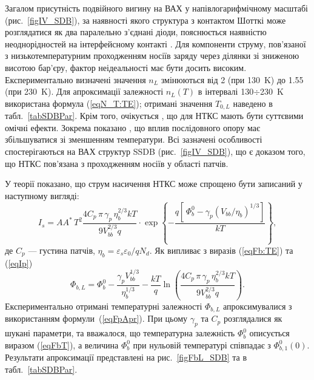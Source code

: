 Загалом присутність подвійного вигину на ВАХ у напівлогарифмічному масштабі (рис.~\ref{figIV_SDB}),
за наявності якого структура з контактом Шотткі може розглядатися як два паралельно з'єднані діоди, пояснюється наявністю неоднорідностей на інтерфейсному контакті \cite{Tung:PhysRev,Tung:MSE}.
Для компоненти струму, пов'язаної з низькотемпературним проходженням носіїв заряду
через ділянки зі зниженою висотою бар'єру,
фактор неідеальності має бути досить високим.
Експериментально визначені значення $n_L$ змінюються від 2 (при 130~K) до 1.55 (при 230~K).
Для апроксимації залежності $n_L(T)$ в  інтервалі 130$\div$230~K  використана формула (\ref{eqN_T:TE});
отримані значення $T_{0,L}$ наведено в табл.~\ref{tabSDBPar}.
Крім того, очікується \cite{Tung:PhysRev,Tung:MSE}, що для НТКС мають бути суттєвими омічні ефекти.
Зокрема показано \cite{Gammon2013}, що вплив послідовного опору має збільшуватися зі зменшенням температури.
Всі зазначені особливості спостерігаються на ВАХ структур SSDB (рис.~\ref{figIV_SDB}),
що є доказом того, що НТКС пов'язана з проходженням носіїв у області патчів.


У теорії \cite{Tung:PhysRev} показано, що струм насичення НТКС може спрощено бути записаний у наступному вигляді:
\begin{equation}
\label{eqIp}
I_s=AA^*\,T^2\frac{4C_p\,\pi\,\gamma_p\,\eta_b^{2/3}kT}{9V_{bb}^{2/3}q}\cdot
\exp\left\{-\frac{q\left[\,\Phi_{b}^0-\gamma_p (V_{bb}/\eta_b)^{1/3}\right]}{kT}\right\},
\end{equation}
де
$C_p$ --- густина патчів,
$\eta_{b}=\varepsilon_s\varepsilon_0/qN_d$.
Як випливає з виразів (\ref{eqFb:TE}) та (\ref{eqIp})
\begin{equation}
\label{eqFpApr}
\Phi_{b,L}=\Phi_{b}^0-\frac{\gamma_p V_{bb}^{1/3}}{\eta_b^{1/3}} -\frac{kT}{q}\ln\left(\frac{4C_p\,\pi\,\gamma_p\,\eta_b^{2/3}kT}{9V_{bb}^{2/3}q}\right).
\end{equation}
Експериментально отримані температурні залежності $\Phi_{b,L}$ апроксимувалися з використанням формули~(\ref{eqFpApr}).
При цьому $\gamma_p$ та $C_p$ розглядалися як шукані параметри,
та вважалося, що температурна залежність $\Phi_{b}^0$ описується виразом (\ref{eqFbT}), а величина $\Phi_{b}^0$ при нульовій температурі
співпадає з $\Phi_{b,1}^0(0)$.
Результати апроксимації представлені на рис.~\ref{figFbL_SDB} та в табл.~\ref{tabSDBPar}.



